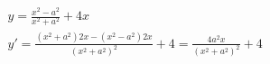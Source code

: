\begin{ex}
\begin{align}
&y=\frac{x^2-a^2}{x^2+a^2}+4x\nonumber\\
&y'=\frac{(x^2+a^2)2x-(x^2-a^2)2x}{(x^2+a^2)^2}+4=\frac{4a^2x}{(x^2+a^2)^2}+4\nonumber
\end{align}
\end{ex}